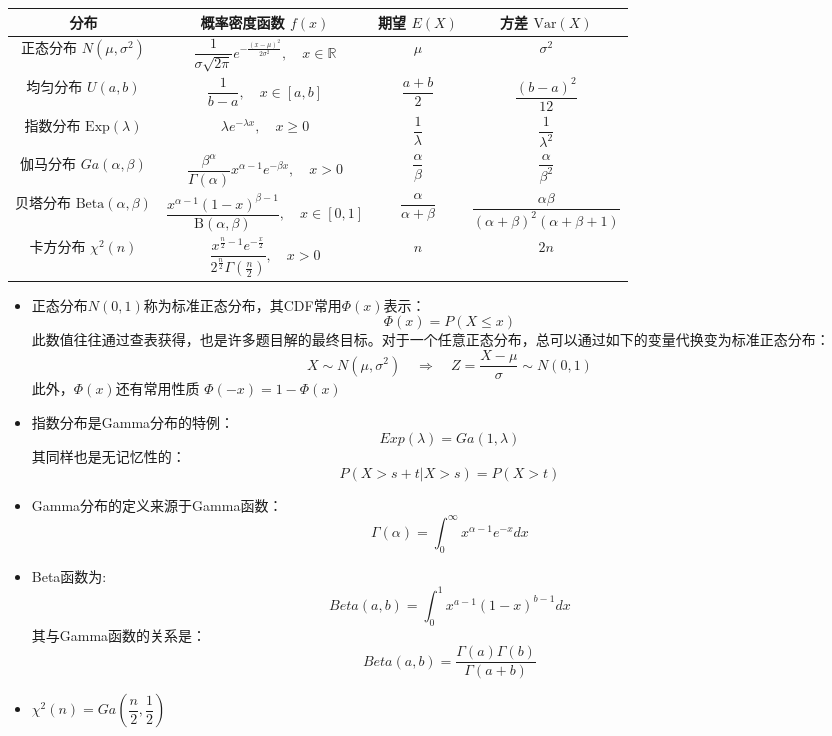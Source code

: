 \documentclass[a4paper]{ctexart}
\begin{document}
        \vspace{6pt}
        \begin{center}
        \begin{tabular}{|c|c|c|c|}
        \hline
        \textbf{分布} & \textbf{概率密度函数 } $f(x)$ & \textbf{期望 } $E(X)$ & \textbf{方差 } $\mathrm{Var}(X)$ \\
        \hline
        正态分布 $N(\mu,\sigma^2)$ & $\dfrac{1}{\sigma\sqrt{2\pi}} e^{-\frac{(x-\mu)^2}{2\sigma^2}},\quad x\in\mathbb{R}$ & $\mu$ & $\sigma^2$ \\
        \hline
        均匀分布 $U(a,b)$ & $\dfrac{1}{b-a},\quad x\in[a,b]$ & $\dfrac{a+b}{2}$ & $\dfrac{(b-a)^2}{12}$ \\
        \hline
        指数分布 $\mathrm{Exp}(\lambda)$ & $\lambda e^{-\lambda x},\quad x\ge 0$ & $\dfrac{1}{\lambda}$ & $\dfrac{1}{\lambda^2}$ \\
        \hline
        伽马分布 $Ga(\alpha,\beta)$ & $\dfrac{\beta^\alpha}{\Gamma(\alpha)} x^{\alpha-1} e^{-\beta x},\quad x>0$ & $\dfrac{\alpha}{\beta}$ & $\dfrac{\alpha}{\beta^2}$ \\
        \hline
        贝塔分布 $\mathrm{Beta}(\alpha,\beta)$ & $\dfrac{x^{\alpha-1}(1-x)^{\beta-1}}{\mathrm{B}(\alpha,\beta)},\quad x\in[0,1]$ & $\dfrac{\alpha}{\alpha+\beta}$ & $\dfrac{\alpha\beta}{(\alpha+\beta)^2(\alpha+\beta+1)}$ \\
        \hline
        卡方分布 $\chi^2(n)$ & $\dfrac{x^{\frac{n}{2}-1} e^{-\frac{x}{2}}}{2^{\frac{n}{2}} \Gamma(\frac{n}{2})},\quad x>0$ & $n$ & $2n$ \\
        \hline
    \end{tabular}
\end{center}
\begin{tipbox}
    \begin{itemize}
        \item 正态分布$N(0,1)$称为标准正态分布，其CDF常用$\Phi(x)$表示：
        \[\Phi(x)=P(X\leq x)\]
        此数值往往通过查表获得，也是许多题目解的最终目标。对于一个任意正态分布，总可以通过如下的变量代换变为标准正态分布：
        \[
        X \sim N(\mu,\sigma^2) \quad \Rightarrow \quad Z = \frac{X-\mu}{\sigma} \sim N(0,1)
        \]
        此外，$\Phi(x)$还有常用性质 $\Phi(-x)=1-\Phi(x)$
        \item  指数分布是Gamma分布的特例：
        \[Exp(\lambda)=Ga(1,\lambda)\]
        其同样也是无记忆性的：
        \[P(X>s+t|X>s)=P(X>t)\]
        \item Gamma分布的定义来源于Gamma函数：
        \[
        \Gamma(\alpha) =\int_0^{\infty} x^{\alpha-1}e^{-x} dx
        \]
        \item Beta函数为:
        \[Beta(a,b)=\int_0 ^1 x^{a-1}(1-x)^{b-1} dx\]
        其与Gamma函数的关系是：
        \[Beta(a,b)=\dfrac{\Gamma(a)\Gamma(b)}{\Gamma(a+b)}\]
        \item $\chi^2(n)=Ga(\dfrac{n}{2},\dfrac{1}{2})$
    \end{itemize}
\end{tipbox}
\end{document}

